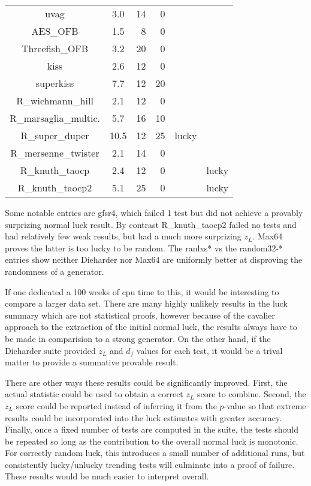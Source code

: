 \begin{table}
\begin{tabular}{|c|S[table-format=2.1]|r|r|c|c|}
uvag & 3.0 & 14 & 0 & & \\
AES\_OFB & 1.5 & 8 & 0 &  & \\
Threefish\_OFB & 3.2 & 20 & 0 & & \\
kiss & 2.6 & 12 & 0 &  & \\
superkiss & 7.7 & 12 & 20 & & \\
R\_wichmann\_hill & 2.1 & 12 & 0 &  & \\
R\_marsaglia\_multic. & 5.7 & 16 & 10 & & \\
R\_super\_duper & 10.5 & 12 & 25 & lucky & \\
R\_mersenne\_twister & 2.1 & 14 & 0 &  & \\
R\_knuth\_taocp & 2.4 & 12 & 0 &  & lucky \\
R\_knuth\_taocp2 & 5.1 & 25 & 0 & & lucky \\
\hline
\end{tabular}
\end{table}
Some notable entries are gfsr4, which failed 1 test but did not achieve a provably surprizing normal luck result.  By contrast R\_knuth\_taocp2 failed no tests and had relatively few weak results, but had a much more surprizing $z_L$.  Max64 proves the latter is too lucky to be random.  The ranlxs* vs the random32-* entries show neither Dieharder nor Max64 are uniformly better at disproving the randomness of a generator.

If one dedicated a 100 weeks of cpu time to this, it would be interesting to compare a larger data set.  There are many highly unlikely results in the luck summary which are not statistical proofs, however because of the cavalier approach to the extraction of the initial normal luck, the results always have to be made in comparision to a strong generator.  On the other hand, if the Dieharder suite provided $z_L$ and $d_f$ values for each test, it would be a trival matter to provide a summative provable result.

There are other ways these results could be significantly improved.  First, the actual statistic could be used to obtain a correct $z_L$ score to combine.  Second, the $z_L$ score could be reported instead of inferring it from the $p$-value so that extreme results could be incorporated into the luck estimates with greater accuracy.  Finally, once a fixed number of tests are computed in the suite, the tests should be repeated so long as the contribution to the overall normal luck is monotonic.  For correctly random luck, this introduces a small number of additional runs, but consistently lucky/unlucky trending tests will culminate into a proof of failure.  These results would be much easier to interpret overall.

